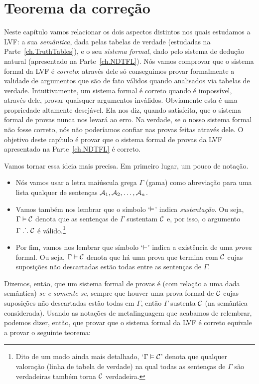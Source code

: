 
\chapter{Teorema da correção}\label{ch:Soundness}

Neste capítulo vamos relacionar os dois aspectos distintos nos quais estudamos a LVF: a sua \textit{semântica}, dada pelas tabelas de verdade (estudadas  na Parte~\ref{ch.TruthTables}), e o seu \emph{sistema formal}, dado pelo sistema de dedução natural (apresentado na Parte~\ref {ch.NDTFL}).
Nós vamos comprovar que o sistema formal da LVF é \textit{correto}: através dele só conseguimos provar formalmente a validade de argumentos que são de fato válidos quando analisados via tabelas de verdade.
Intuitivamente, um sistema formal é correto quando é impossível, através dele, provar quaisquer argumentos inválidos.
Obviamente esta é uma propriedade altamente desejável.
Ela nos diz, quando satisfeita, que o sistema formal de provas nunca nos levará ao erro.
Na verdade, se o nosso sistema formal não fosse correto, nós não poderíamos confiar nas provas feitas através dele.
O objetivo deste capítulo é provar que o sistema formal de provas da LVF apresentado na Parte~\ref {ch.NDTFL} é correto.

Vamos tornar essa ideia mais precisa.
Em primeiro lugar, um pouco de notação.
\begin{itemize}
	\item Nós vamos usar a letra maiúscula grega $\Gamma$ (gama) como abreviação para uma lista qualquer de sentenças $\mathcal{A}_1, \mathcal{A}_2, \ldots, \mathcal{A}_n$.
	\item Vamos também nos lembrar que o símbolo `$\vDash$' indica \textit{sustentação}. Ou seja, $\Gamma \vDash \mathcal{C}$ denota que as sentenças de $\Gamma$ sustentam $\mathcal{C}$ e, por isso, o argumento $\Gamma \mathrel{\ldotp\dot{}\,\ldotp} \mathcal{C}$ é válido.\footnote{
		Dito de um modo ainda mais detalhado, `$\Gamma \vDash \mathcal{C}$' denota que qualquer valoração (linha de tabela de verdade) na qual todas as sentenças de $\Gamma$ são verdadeiras também torna $\mathcal{C}$ verdadeira.}
	\item Por fim, vamos nos lembrar que símbolo `$\vdash$' indica a existência de uma \textit{prova} formal. Ou seja, $\Gamma \vdash \mathcal{C}$ denota que há uma prova que termina com $\mathcal{C}$ cujas suposições não descartadas estão todas entre as sentenças de $\Gamma$.	
\end{itemize}
Dizemos, então, que um sistema formal de provas é  (com relação a uma dada semântica) \emph{se e somente se}, sempre que houver uma prova formal de $\mathcal{C}$ cujas suposições não descartadas estão todas em $\Gamma$, então $\Gamma$ sustenta $\mathcal{C}$ (na semântica considerada). 
Usando as notações de metalinguagem que acabamos de relembrar, podemos dizer, então, que provar que o sistema formal da LVF é correto equivale a provar o seguinte teorema:

